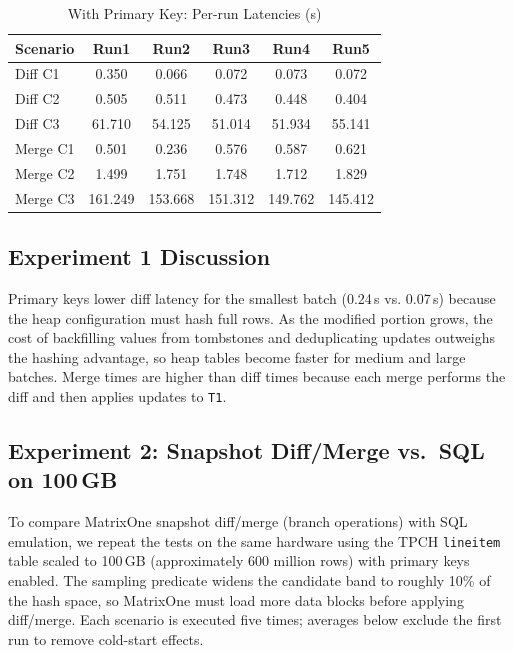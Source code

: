 \documentclass[sigconf,nonacm]{acmart} %
\begin{document}
\begin{table}[h]
  \centering
  \caption{With Primary Key: Per-run Latencies (s)}
  \label{tab:pk-runs}
  \begin{tabular}{lccccc}
    \toprule
    Scenario & Run1 & Run2 & Run3 & Run4 & Run5 \\
    \midrule
    Diff C1  & 0.350 & 0.066 & 0.072 & 0.073 & 0.072 \\
    Diff C2  & 0.505 & 0.511 & 0.473 & 0.448 & 0.404 \\
    Diff C3  & 61.710 & 54.125 & 51.014 & 51.934 & 55.141 \\
    Merge C1 & 0.501 & 0.236 & 0.576 & 0.587 & 0.621 \\
    Merge C2 & 1.499 & 1.751 & 1.748 & 1.712 & 1.829 \\
    Merge C3 & 161.249 & 153.668 & 151.312 & 149.762 & 145.412 \\
    \bottomrule
  \end{tabular}
\end{table}

\subsection{Experiment 1 Discussion}
Primary keys lower diff latency for the smallest batch (0.24\,s vs.
0.07\,s) because the heap configuration must hash full rows.  As the
modified portion grows, the cost of backfilling values from tombstones
and deduplicating updates outweighs the hashing advantage, so heap
tables become faster for medium and large batches.  Merge times are
higher than diff times because each merge performs the diff and then
applies updates to \texttt{T1}.

\subsection{Experiment 2: Snapshot Diff/Merge vs.\ SQL on 100\,GB}
To compare MatrixOne snapshot diff/merge (branch operations) with SQL
emulation, we repeat the tests on the same hardware using the TPCH
\texttt{lineitem} table scaled to 100\,GB (approximately 600 million
rows) with primary keys enabled.  The sampling predicate widens the
candidate band to roughly 10\% of the hash space, so MatrixOne must load
more data blocks before applying diff/merge.  Each scenario is executed
five times; averages below exclude the first run to remove cold-start
effects.
\end{document}
